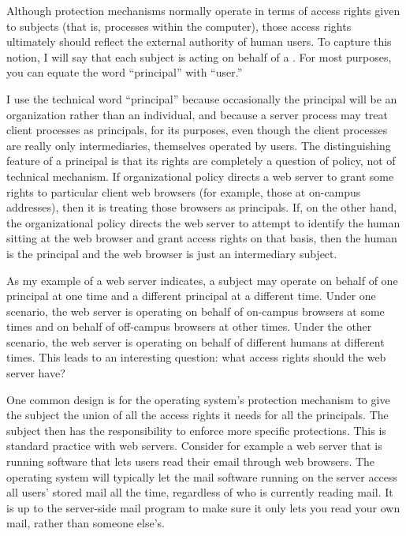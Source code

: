 Although protection mechanisms normally operate in terms of access
rights given to subjects (that is, processes within the computer), those
access rights ultimately should reflect the external authority of
human users.  To capture this notion, I will say that each subject is
acting on behalf of a . For most purposes, you can
equate the word ``principal'' with ``user.''

I use the technical word ``principal'' because occasionally the
principal will be an organization rather than an individual, and
because a server process may treat client processes as principals, for
its purposes, even though the client processes are really only
intermediaries, themselves operated by users.  The distinguishing
feature of a principal is that its rights are completely a question of
policy, not of technical mechanism.  If organizational policy directs
a web server to grant some rights to particular client web browsers
(for example, those at on-campus addresses), then it is treating those
browsers as principals.  If, on the other hand, the organizational
policy directs the web server to attempt to identify the human sitting
at the web browser and grant access rights on that basis, then the
human is the principal and the web browser is just an intermediary
subject.

As my example of a web server indicates, a subject may operate on
behalf of one principal at one time and a different principal at a
different time.  Under one scenario, the web server is operating on
behalf of on-campus browsers at some times and on behalf of off-campus
browsers at other times.  Under the other scenario, the web server is
operating on behalf of different humans at different times.  This leads
to an interesting question: what access rights should the web server have?

One common design is for the operating system's protection mechanism
to give the subject the union of all the access rights it needs for
all the principals.  The subject then has the responsibility to
enforce more specific protections.  This is standard practice with web
servers.  Consider for example a web server that is running software
that lets users read their email through web browsers.  The operating
system will typically let the mail software running on the server
access all users' stored mail all the time, regardless of who is
currently reading mail.  It is up to the server-side mail program to
make sure it only lets you read your own mail, rather than someone
else's.

